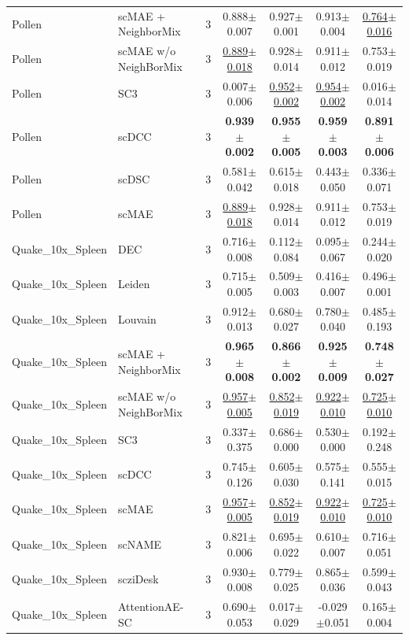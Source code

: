 \begin{table}[t]
\begin{tabular}{llrcccc}
Pollen & scMAE + NeighborMix & 3 & 0.888$\pm$0.007 & 0.927$\pm$0.001 & 0.913$\pm$0.004 & \underline{0.764$\pm$0.016} \\
Pollen & scMAE w/o NeighBorMix & 3 & \underline{0.889$\pm$0.018} & 0.928$\pm$0.014 & 0.911$\pm$0.012 & 0.753$\pm$0.019 \\
Pollen & SC3 & 3 & 0.007$\pm$0.006 & \underline{0.952$\pm$0.002} & \underline{0.954$\pm$0.002} & 0.016$\pm$0.014 \\
Pollen & scDCC & 3 & \textbf{0.939$\pm$0.002} & \textbf{0.955$\pm$0.005} & \textbf{0.959$\pm$0.003} & \textbf{0.891$\pm$0.006} \\
Pollen & scDSC & 3 & 0.581$\pm$0.042 & 0.615$\pm$0.018 & 0.443$\pm$0.050 & 0.336$\pm$0.071 \\
Pollen & scMAE & 3 & \underline{0.889$\pm$0.018} & 0.928$\pm$0.014 & 0.911$\pm$0.012 & 0.753$\pm$0.019 \\
\midrule
Quake\_10x\_Spleen & DEC & 3 & 0.716$\pm$0.008 & 0.112$\pm$0.084 & 0.095$\pm$0.067 & 0.244$\pm$0.020 \\
Quake\_10x\_Spleen & Leiden & 3 & 0.715$\pm$0.005 & 0.509$\pm$0.003 & 0.416$\pm$0.007 & 0.496$\pm$0.001 \\
Quake\_10x\_Spleen & Louvain & 3 & 0.912$\pm$0.013 & 0.680$\pm$0.027 & 0.780$\pm$0.040 & 0.485$\pm$0.193 \\
Quake\_10x\_Spleen & scMAE + NeighborMix & 3 & \textbf{0.965$\pm$0.008} & \textbf{0.866$\pm$0.002} & \textbf{0.925$\pm$0.009} & \textbf{0.748$\pm$0.027} \\
Quake\_10x\_Spleen & scMAE w/o NeighBorMix & 3 & \underline{0.957$\pm$0.005} & \underline{0.852$\pm$0.019} & \underline{0.922$\pm$0.010} & \underline{0.725$\pm$0.010} \\
Quake\_10x\_Spleen & SC3 & 3 & 0.337$\pm$0.375 & 0.686$\pm$0.000 & 0.530$\pm$0.000 & 0.192$\pm$0.248 \\
Quake\_10x\_Spleen & scDCC & 3 & 0.745$\pm$0.126 & 0.605$\pm$0.030 & 0.575$\pm$0.141 & 0.555$\pm$0.015 \\
Quake\_10x\_Spleen & scMAE & 3 & \underline{0.957$\pm$0.005} & \underline{0.852$\pm$0.019} & \underline{0.922$\pm$0.010} & \underline{0.725$\pm$0.010} \\
Quake\_10x\_Spleen & scNAME & 3 & 0.821$\pm$0.006 & 0.695$\pm$0.022 & 0.610$\pm$0.007 & 0.716$\pm$0.051 \\
Quake\_10x\_Spleen & scziDesk & 3 & 0.930$\pm$0.008 & 0.779$\pm$0.025 & 0.865$\pm$0.036 & 0.599$\pm$0.043 \\
Quake\_10x\_Spleen & AttentionAE-SC & 3 & 0.690$\pm$0.053 & 0.017$\pm$0.029 & -0.029$\pm$0.051 & 0.165$\pm$0.004 \\

\end{tabular}
\end{table}
